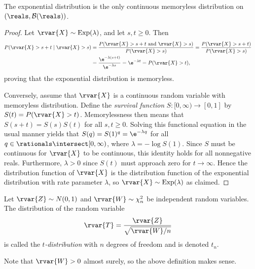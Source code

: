 \documentclass[article, a4paper, 11pt, oneside]{memoir}
\numberwithin{equation}{chapter}
\newcommand{\borel}{\mathcal{B}}
\begin{document}
\begin{proposition}
    The exponential distribution is the only continuous memoryless distribution on $(\reals,\borel(\reals))$.
\end{proposition}

\begin{proof}
    Let $\rvar{X} \sim \Exp(\lambda)$, and let $s,t \geq 0$. Then
    \begin{align*}
        P(\rvar{X} > s+t \mid \rvar{X} > s)
            &= \frac{P(\rvar{X} > s+t \text{ and } \rvar{X} > s)}{P(\rvar{X} > s)}
             = \frac{P(\rvar{X} > s+t)}{P(\rvar{X} > s)} \\
            &= \frac{ \e^{-\lambda(s+t)} }{ \e^{-\lambda s}}
             = \e^{-\lambda t}
             = P(\rvar{X} > t),
    \end{align*}
    proving that the exponential distribution is memoryless.
    
    Conversely, assume that $\rvar{X}$ is a continuous random variable with memoryless distribution. Define the \emph{survival function} $S \colon [0,\infty) \to [0,1]$ by $S(t) = P(\rvar{X} > t)$. Memorylessness then means that $S(s+t) = S(s) S(t)$ for all $s,t \geq 0$. Solving this functional equation in the usual manner yields that $S(q) = S(1)^q = \e^{-\lambda q}$ for all $q \in \rationals \intersect [0,\infty)$, where $\lambda = -\log S(1)$. Since $S$ must be continuous for $\rvar{X}$ to be continuous, this identity holds for all nonnegative reals. Furthermore, $\lambda > 0$ since $S(t)$ must approach zero for $t \to \infty$. Hence the distribution function of $\rvar{X}$ is the distribution function of the exponential distribution with rate parameter $\lambda$, so $\rvar{X} \sim \Exp(\lambda)$ as claimed.
\end{proof}



\begin{definition}
    Let $\rvar{Z} \sim N(0,1)$ and $\rvar{W} \sim \chi^2_n$ be independent random variables. The distribution of the random variable
    \begin{equation*}
        \rvar{T}
            = \frac{ \rvar{Z} }{ \sqrt{\rvar{W}/n} }
    \end{equation*}
    is called the \emph{$t$-distribution} with $n$ degrees of freedom and is denoted $t_n$.
\end{definition}
%
Note that $\rvar{W} > 0$ almost surely, so the above definition makes sense.


\newcommand{\avg}[1]{\altoverline{#1}}
\end{document}
